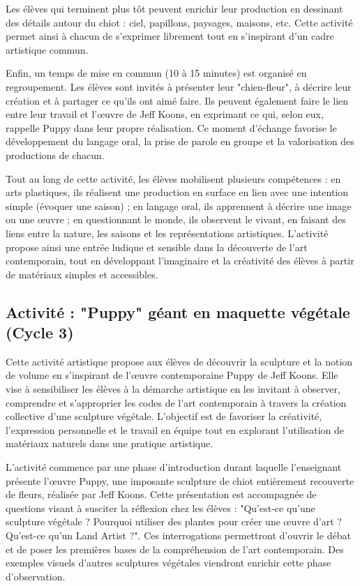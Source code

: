 \documentclass[12pt]{article}
\begin{document}
Les élèves qui terminent plus tôt peuvent enrichir leur production en dessinant des détails autour du chiot : ciel, papillons, paysages, maisons, etc. Cette activité permet ainsi à chacun de s’exprimer librement tout en s’inspirant d’un cadre artistique commun.

Enfin, un temps de mise en commun (10 à 15 minutes) est organisé en regroupement. Les élèves sont invités à présenter leur "chien-fleur", à décrire leur création et à partager ce qu’ils ont aimé faire. Ils peuvent également faire le lien entre leur travail et l’œuvre de Jeff Koons, en exprimant ce qui, selon eux, rappelle Puppy dans leur propre réalisation. Ce moment d’échange favorise le développement du langage oral, la prise de parole en groupe et la valorisation des productions de chacun.

Tout au long de cette activité, les élèves mobilisent plusieurs compétences : en arts plastiques, ils réalisent une production en surface en lien avec une intention simple (évoquer une saison) ; en langage oral, ils apprennent à décrire une image ou une œuvre ; en questionnant le monde, ils observent le vivant, en faisant des liens entre la nature, les saisons et les représentations artistiques. L’activité propose ainsi une entrée ludique et sensible dans la découverte de l’art contemporain, tout en développant l’imaginaire et la créativité des élèves à partir de matériaux simples et accessibles.

\subsection*{Activité : "Puppy" géant en maquette végétale (Cycle 3)}

Cette activité artistique propose aux élèves de découvrir la sculpture et la notion de volume en s’inspirant de l’œuvre contemporaine Puppy de Jeff Koons. Elle vise à sensibiliser les élèves à la démarche artistique en les invitant à observer, comprendre et s’approprier les codes de l’art contemporain à travers la création collective d’une sculpture végétale. L’objectif est de favoriser la créativité, l’expression personnelle et le travail en équipe tout en explorant l’utilisation de matériaux naturels dans une pratique artistique.

L’activité commence par une phase d’introduction durant laquelle l’enseignant présente l’œuvre Puppy, une imposante sculpture de chiot entièrement recouverte de fleurs, réalisée par Jeff Koons. Cette présentation est accompagnée de questions visant à susciter la réflexion chez les élèves : "Qu’est-ce qu’une sculpture végétale ? Pourquoi utiliser des plantes pour créer une œuvre d’art ? Qu’est-ce qu’un Land Artist ?". Ces interrogations permettront d’ouvrir le débat et de poser les premières bases de la compréhension de l’art contemporain. Des exemples visuels d’autres sculptures végétales viendront enrichir cette phase d’observation.
\end{document}
